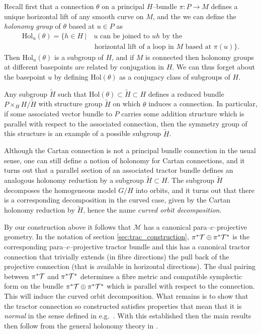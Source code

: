 Recall first that a connection $\theta$ on a principal $H$--bundle $\pi:P\rightarrow M$ defines a unique horizontal lift of any smooth curve on $M$, and the we can define the \textit{holonomy group} of $\theta$ based at $u\in P$ as
\begin{align*}
\mathrm{Hol}_u(\theta)=\{h\in H\ |&\ u\mbox{ can be joined to }uh\mbox{ by the}\\
&\mbox{ horizontal lift of a loop in }M\mbox{ based at }\pi(u)\}.
\end{align*}
Then $\mathrm{Hol}_u(\theta)$ is a subgroup of $H$, and if $M$ is connected then holonomy groups at different basepoints are related by conjugation in $H$. We can thus forget about the basepoint $u$ by defining $\mathrm{Hol}(\theta)$ as a conjugacy class of subgroups of $H$.

Any subgroup $\tilde{H}$ such that $\mathrm{Hol}(\theta)\subset \tilde{H}\subset H$ defines a reduced bundle $P\times_H H/\tilde{H}$ with structure group $\tilde{H}$ on which $\theta$ induces a connection. In particular, if some associated vector bundle to $P$ carries some addition structure which is parallel with respect to the associated connection, then the symmetry group of this structure is an example of a possible subgroup $\tilde{H}$.

Although the Cartan connection is not a principal bundle connection in the usual sense, one can still define a notion of holonomy for Cartan connections, and it turns out \cite{CGH-duke} that a parallel section of an associated tractor bundle defines an analogous holonomy reduction by a subgroup $\tilde{H}\subset H$. The subgroup $\tilde{H}$ decomposes the homogeneous model $G/H$ into orbits, and it turns out that there is a corresponding decomposition in the curved case, given by the Cartan holonomy reduction by $\tilde{H}$, hence the name \textit{curved orbit decomposition}. 

By our construction above it follows that $\mathcal{M}$ has a canonical para--$c$--projective geometry. In the notation of section \ref{sec:trac_construction}, $\pi^*{\mathcal{T}}\oplus
\pi^*{\mathcal{T}^*}$ is the corresponding para--$c$--projective tractor bundle and this has a canonical tractor connection that trivially
extends (in fibre directions) the pull back of the projective
connection (that is available in horizontal directions). The
dual pairing between $\pi^*{\mathcal{T}}$ and $\pi^*{\mathcal{T}^*}$ determines a
fibre metric and compatible symplectic form on the bundle
$\pi^*{\mathcal{T}}\oplus \pi^*{\mathcal{T}^*}$ which is parallel with respect to the connection. This will induce the curved orbit decomposition. What remains is to show that the tractor connection so
constructed satisfies properties that mean that it is {\em normal} in
the sense defined in e.g.\ \cite{CS-book}. With this established then
the main results then follow from the general holonomy theory in
\cite{CGH-duke}.


